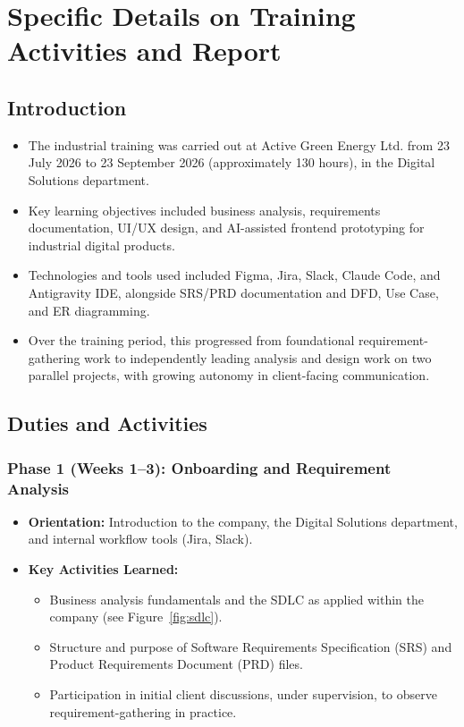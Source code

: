 \chapter{Specific Details on Training Activities and Report}
\label{chapter-3}

\section{Introduction}
\begin{itemize}
    \item The industrial training was carried out at Active Green Energy Ltd. from 23 July 2026 to 23 September 2026 (approximately 130 hours), in the Digital Solutions department.
    \item Key learning objectives included business analysis, requirements documentation, UI/UX design, and AI-assisted frontend prototyping for industrial digital products.
    \item Technologies and tools used included Figma, Jira, Slack, Claude Code, and Antigravity IDE, alongside SRS/PRD documentation and DFD, Use Case, and ER diagramming.
    \item Over the training period, this progressed from foundational requirement-gathering work to independently leading analysis and design work on two parallel projects, with growing autonomy in client-facing communication.
\end{itemize}

\section{Duties and Activities}

\subsection{Phase 1 (Weeks 1--3): Onboarding and Requirement Analysis}
\begin{itemize}
    \item \textbf{Orientation:} Introduction to the company, the Digital Solutions department, and internal workflow tools (Jira, Slack).
    \item \textbf{Key Activities Learned:}
    \begin{itemize}
        \item Business analysis fundamentals and the SDLC as applied within the company (see Figure~\ref{fig:sdlc}).
        \item Structure and purpose of Software Requirements Specification (SRS) and Product Requirements Document (PRD) files.
        \item Participation in initial client discussions, under supervision, to observe requirement-gathering in practice.
    \end{itemize}
\end{itemize}

